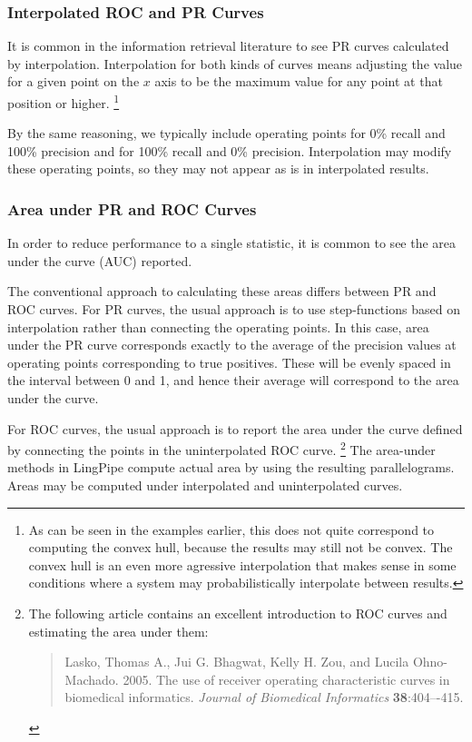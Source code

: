 \subsubsection{Interpolated ROC and PR Curves}

It is common in the information retrieval literature to see PR curves
calculated by interpolation.  Interpolation for both kinds of
curves means adjusting the value for a given point on the $x$ axis
to be the maximum value for any point at that position or higher.%
%
\footnote{As can be seen in the examples earlier, this does not quite
  correspond to computing the convex hull, because the results may
  still not be convex.  The convex hull is an even more agressive
  interpolation that makes sense in some conditions where a system
  may probabilistically interpolate between results.}

By the same reasoning, we typically include operating points for 0\%
recall and 100\% precision and for 100\% recall and 0\% precision.
Interpolation may modify these operating points, so they may not
appear as is in interpolated results.


\subsubsection{Area under PR and ROC Curves}

In order to reduce performance to a single statistic, it is common to
see the area under the curve (AUC) reported.  

The conventional approach to calculating these areas differs between
PR and ROC curves.  For PR curves, the usual approach is to use
step-functions based on interpolation rather than connecting the
operating points.  In this case, area under the PR curve corresponds
exactly to the average of the precision values at operating points
corresponding to true positives.  These will be evenly spaced in the
interval between 0 and 1, and hence their average will correspond to
the area under the curve.

For ROC curves, the usual approach is to report the area under the
curve defined by connecting the points in the uninterpolated ROC
curve.%
%
\footnote{The following article contains an excellent introduction to
  ROC curves and estimating the area under them: 
\begin{quote}
Lasko, Thomas A., Jui
  G. Bhagwat, Kelly H. Zou, and Lucila Ohno-Machado.  2005. The use
  of receiver operating characteristic curves in biomedical
  informatics.  {\it Journal of Biomedical Informatics}
  {\bf 38}:404–-415.
\end{quote}}
%
The area-under methods in LingPipe compute actual area by using the
resulting parallelograms.  Areas may be computed under interpolated
and uninterpolated curves.

